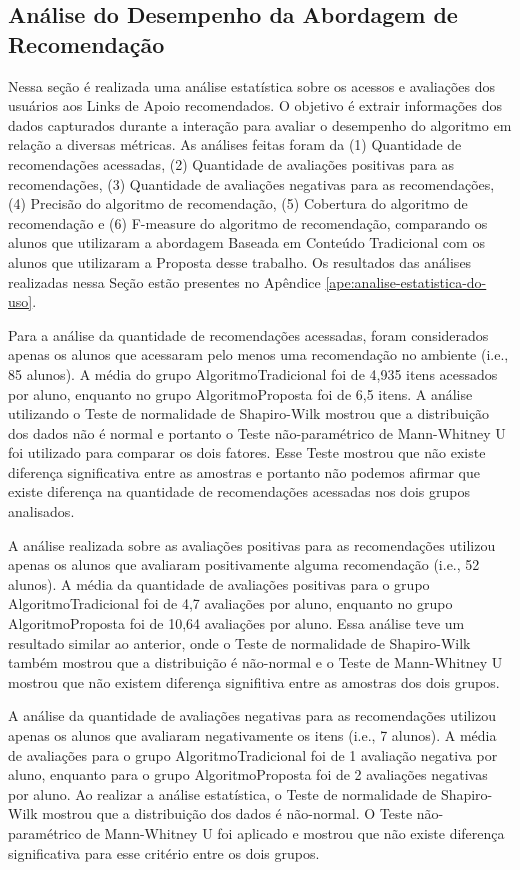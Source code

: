 \subsection{Análise do Desempenho da Abordagem de Recomendação}\label{subsection:analise-uso-sr}

Nessa seção é realizada uma análise estatística sobre os acessos e avaliações dos usuários aos Links de Apoio recomendados.
O objetivo é extrair informações dos dados capturados durante a interação para avaliar o desempenho do algoritmo em
relação a diversas métricas. As análises feitas foram da (1) Quantidade de recomendações acessadas,
(2) Quantidade de avaliações positivas para as recomendações, (3) Quantidade de avaliações negativas para as recomendações,
(4) Precisão do algoritmo de recomendação, (5) Cobertura do algoritmo de recomendação e (6) F-measure do algoritmo de
recomendação, comparando os alunos que utilizaram a abordagem Baseada em Conteúdo Tradicional com os alunos
que utilizaram a Proposta desse trabalho. Os resultados das análises realizadas nessa Seção estão presentes no Apêndice \ref{ape:analise-estatistica-do-uso}.

Para a análise da quantidade de recomendações acessadas, foram considerados apenas os alunos que acessaram pelo
menos uma recomendação no ambiente (i.e., 85 alunos). A média do grupo AlgoritmoTradicional foi de 4,935 itens
acessados por aluno, enquanto no grupo AlgoritmoProposta foi de 6,5 itens. A análise utilizando o Teste de normalidade de
Shapiro-Wilk mostrou que a distribuição dos dados não é normal e portanto o Teste não-paramétrico de Mann-Whitney U foi utilizado
para comparar os dois fatores. Esse Teste mostrou que não existe diferença significativa entre as amostras e portanto
não podemos afirmar que existe diferença na quantidade de recomendações acessadas nos dois grupos analisados.

A análise realizada sobre as avaliações positivas para as recomendações utilizou apenas os alunos que avaliaram positivamente
alguma recomendação (i.e., 52 alunos). A média da quantidade de avaliações positivas para o grupo AlgoritmoTradicional
foi de 4,7 avaliações por aluno, enquanto no grupo AlgoritmoProposta foi de 10,64 avaliações por aluno.
Essa análise teve um resultado similar ao anterior, onde o Teste de normalidade de Shapiro-Wilk também mostrou que a
distribuição é não-normal e o Teste de Mann-Whitney U mostrou que não existem diferença signifitiva entre
as amostras dos dois grupos.

A análise da quantidade de avaliações negativas para as recomendações utilizou apenas os alunos que avaliaram negativamente
os itens (i.e., 7 alunos). A média de avaliações para o grupo AlgoritmoTradicional foi de 1 avaliação negativa
por aluno, enquanto para o grupo AlgoritmoProposta foi de 2 avaliações negativas por aluno. Ao realizar
a análise estatística, o Teste de normalidade de Shapiro-Wilk mostrou que a distribuição dos dados é não-normal. O Teste
não-paramétrico de Mann-Whitney U foi aplicado e mostrou que não existe diferença significativa para esse critério entre
os dois grupos.

